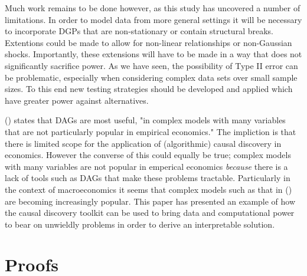 \documentclass{article}
\begin{document}
Much work remains to be done however, as this study has uncovered a number of limitations. In order to model data from more general settings it will be necessary to incorporate DGPs that are non-stationary or contain structural breaks. Extentions could be made to allow for non-linear relationships or non-Gaussian shocks. Importantly, these extensions will have to be made in a way that does not significantly sacrifice power. As we have seen, the possibility of Type II error can be problematic, especially when considering complex data sets over small sample sizes. To this end new testing strategies should be developed and applied which have greater power against alternatives. 

\citeauthor{imbens2019potential} (\citeyear{imbens2019potential}) states that DAGs are most useful, "in complex models with many variables that are not particularly popular in empirical economics." The impliction is that there is limited scope for the application of (algorithmic) causal discovery in economics. However the converse of this could equally be true; complex models with many variables are not popular in emperical economics \textit{because} there is a lack of tools such as DAGs that make these problems tractable. Particularly in the context of macroeconomics it seems that complex models such as that in \citeauthor{smets2007shocks} (\citeyear{smets2007shocks}) are becoming increasingly popular. This paper has presented an example of how the causal discovery toolkit can be used to bring data and computational power to bear on unwieldly problems in order to derive an interpretable solution.

\newpage
\printbibliography

\newpage
\appendix
\section{Proofs} \label{proofs}
\end{document}
